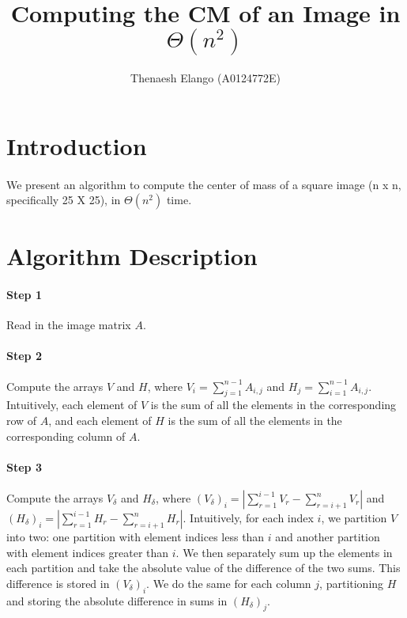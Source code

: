 \documentclass[]{article}
\title{Computing the CM of an Image in $\Theta(n^2)$}
\author{Thenaesh Elango (A0124772E)}
\begin{document}
	
	
	\maketitle
	
	\section{Introduction}
		\paragraph{}
		We present an algorithm to compute the center of mass of a square image (n x n, specifically 25 X 25), in $\Theta(n^2)$ time.
		
	\section{Algorithm Description}
		\paragraph{Step 1}
		Read in the image matrix $A$.
		\paragraph{Step 2}
		Compute the arrays $V$ and $H$, where $V_i = \sum\nolimits_{j = 1}^{n - 1} A_{i,j}$ and $H_j = \sum\nolimits_{i = 1}^{n - 1} A_{i,j}$. Intuitively, each element of $V$ is the sum of all the elements in the corresponding row of $A$, and each element of $H$ is the sum of all the elements in the corresponding column of $A$.
		\paragraph{Step 3}
		Compute the arrays $V_\delta$ and $H_\delta$, where $(V_\delta)_i = |\sum\nolimits_{r = 1}^{i - 1} V_r - \sum\nolimits_{r = i + 1}^{n} V_r|$ and $(H_\delta)_i = |\sum\nolimits_{r = 1}^{i - 1} H_r - \sum\nolimits_{r = i + 1}^{n} H_r|$. Intuitively, for each index $i$, we partition $V$ into two: one partition with element indices less than $i$ and another partition with element indices greater than $i$. We then separately sum up the elements in each partition and take the absolute value of the difference of the two sums. This difference is stored in $(V_\delta)_i.$ We do the same for each column $j$, partitioning $H$ and storing the absolute difference in sums in $(H_\delta)_j$.
		
\end{document}
